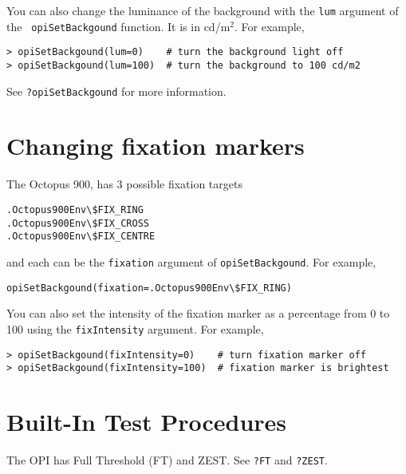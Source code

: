 \documentclass{article}
\begin{document}
You can also change the luminance of the background with the {\tt lum} argument of the {\tt
opiSetBackgound} function. It is in cd/m$^2$.
For example,
\begin{verbatim}
> opiSetBackgound(lum=0)    # turn the background light off
> opiSetBackgound(lum=100)  # turn the background to 100 cd/m2
\end{verbatim}
See {\tt ?opiSetBackgound} for more information.

\section{Changing fixation markers}

The Octopus 900, has 3 possible fixation targets
\begin{verbatim}
.Octopus900Env\$FIX_RING
.Octopus900Env\$FIX_CROSS
.Octopus900Env\$FIX_CENTRE
\end{verbatim}
and each can be the {\tt fixation} argument of {\tt opiSetBackgound}. For example, 
\begin{verbatim}
opiSetBackgound(fixation=.Octopus900Env\$FIX_RING)
\end{verbatim}

You can also set the intensity of the fixation marker as a percentage from 0 to 100 using the
{\tt fixIntensity} argument. 
For example,
\begin{verbatim}
> opiSetBackgound(fixIntensity=0)    # turn fixation marker off
> opiSetBackgound(fixIntensity=100)  # fixation marker is brightest
\end{verbatim}

\section{Built-In Test Procedures}

The OPI has Full Threshold (FT) and ZEST.
See {\tt ?FT} and {\tt ?ZEST}.


\end{document}
